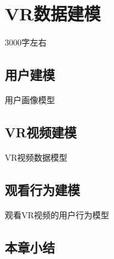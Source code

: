 \chapter{VR数据建模}
3000字左右

\section{用户建模}
用户画像模型

\section{VR视频建模}
VR视频数据模型

\section{观看行为建模}
观看VR视频的用户行为模型

\section{本章小结}
